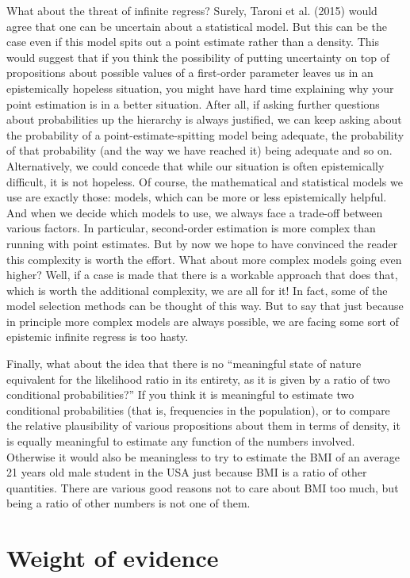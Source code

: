 \documentclass[
  10pt,
  dvipsnames,enabledeprecatedfontcommands]{scrartcl}
\begin{document}
What about the threat of infinite regress? Surely, Taroni et al. (2015)
would agree that one can be uncertain about a statistical model. But
this can be the case even if this model spits out a point estimate
rather than a density. This would suggest that if you think the
possibility of putting uncertainty on top of propositions about possible
values of a first-order parameter leaves us in an epistemically hopeless
situation, you might have hard time explaining why your point estimation
is in a better situation. After all, if asking further questions about
probabilities up the hierarchy is always justified, we can keep asking
about the probability of a point-estimate-spitting model being adequate,
the probability of that probability (and the way we have reached it)
being adequate and so on. Alternatively, we could concede that while our
situation is often epistemically difficult, it is not hopeless. Of
course, the mathematical and statistical models we use are exactly
those: models, which can be more or less epistemically helpful. And when
we decide which models to use, we always face a trade-off between
various factors. In particular, second-order estimation is more complex
than running with point estimates. But by now we hope to have convinced
the reader this complexity is worth the effort. What about more complex
models going even higher? Well, if a case is made that there is a
workable approach that does that, which is worth the additional
complexity, we are all for it! In fact, some of the model selection
methods can be thought of this way. But to say that just because in
principle more complex models are always possible, we are facing some
sort of epistemic infinite regress is too hasty.

Finally, what about the idea that there is no ``meaningful state of
nature equivalent for the likelihood ratio in its entirety, as it is
given by a ratio of two conditional probabilities?'' If you think it is
meaningful to estimate two conditional probabilities (that is,
frequencies in the population), or to compare the relative plausibility
of various propositions about them in terms of density, it is equally
meaningful to estimate any function of the numbers involved. Otherwise
it would also be meaningless to try to estimate the BMI of an average 21
years old male student in the USA just because BMI is a ratio of other
quantities. There are various good reasons not to care about BMI too
much, but being a ratio of other numbers is not one of them.

\hypertarget{weight-of-evidence}{%
\section{Weight of evidence}\label{weight-of-evidence}}
\end{document}
